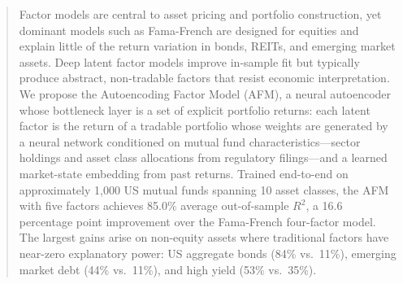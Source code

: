 \begin{abstract}
Factor models are central to asset pricing and portfolio construction, yet dominant models such as Fama-French are designed for equities and explain little of the return variation in bonds, REITs, and emerging market assets. Deep latent factor models improve in-sample fit but typically produce abstract, non-tradable factors that resist economic interpretation. We propose the Autoencoding Factor Model (AFM), a neural autoencoder whose bottleneck layer is a set of explicit portfolio returns: each latent factor is the return of a tradable portfolio whose weights are generated by a neural network conditioned on mutual fund characteristics---sector holdings and asset class allocations from regulatory filings---and a learned market-state embedding from past returns. Trained end-to-end on approximately 1{,}000 US mutual funds spanning 10 asset classes, the AFM with five factors achieves 85.0\% average out-of-sample $R^2$, a 16.6 percentage point improvement over the Fama-French four-factor model. The largest gains arise on non-equity assets where traditional factors have near-zero explanatory power: US aggregate bonds (84\% vs.\ 11\%), emerging market debt (44\% vs.\ 11\%), and high yield (53\% vs.\ 35\%).
\end{abstract}
